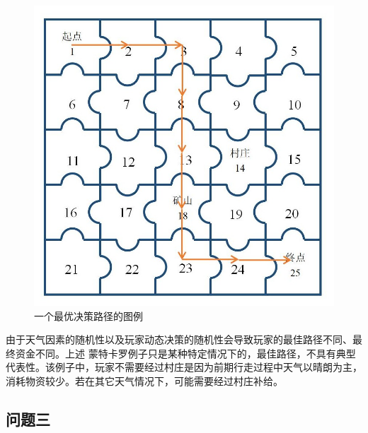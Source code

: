 \documentclass[withoutpre]{cumcmthesis} %
\begin{document}
\begin{figure}[H]
	\centering
	\includegraphics[scale=0.5]{figures/map4path.jpg}
	\caption{一个最优决策路径的图例}
	\label{fig:map4path}
\end{figure}

由于天气因素的随机性以及玩家动态决策的随机性会导致玩家的最佳路径不同、最终资金不同。上述
蒙特卡罗例子只是某种特定情况下的，最佳路径，不具有典型代表性。该例子中，玩家不需要经过村庄是因为前期行走过程中天气以晴朗为主，消耗物资较少。若在其它天气情况下，可能需要经过村庄补给。

\subsection{问题三}
\end{document}
